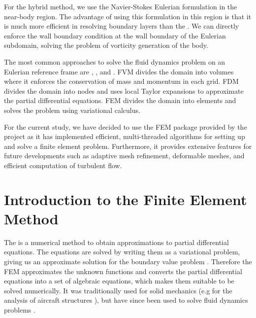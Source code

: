 For the hybrid method, we use the Navier-Stokes Eulerian formulation in the near-body region. The advantage of using this formulation in this region is that it is much more efficient in resolving boundary layers than the . We can directly enforce the wall boundary condition at the wall boundary of the Eulerian subdomain, solving the problem of vorticity generation of the body. %

The most common approaches to solve the fluid dynamics problem on an Eulerian reference frame are , , and . FVM divides the domain into volumes where it enforces the conservation of mass and momentum in each grid. FDM divides the domain into nodes and uses local Taylor expansions to approximate the partial differential equations. FEM divides the domain into elements and solves the problem using variational calculus. %

For the current study, we have decided to use the FEM package provided by the \fenics project as it has implemented efficient, multi-threaded algorithms for setting up and solve a finite element problem. Furthermore, it provides extensive features for future developments such as adaptive mesh refinement, deformable meshes, and efficient computation of turbulent flow.

\section{Introduction to the Finite Element Method}
\label{sec:e-ithfem}
The  is a numerical method to obtain approximations to partial differential equations. The equations are solved by writing them as a variational problem, giving us an approximate solution for the boundary value problem \cite{Brenner2002}. Therefore the FEM approximates the unknown functions and converts the partial differential equations into a set of algebraic equations, which makes them suitable to be solved numerically. It was traditionally used for solid mechanics (e.g for the analysis of aircraft structures \cite{RAO2011}), but have since been used to solve fluid dynamics problems \cite{Guermond2006a,Johnston2004a,Guermond2003a}.

